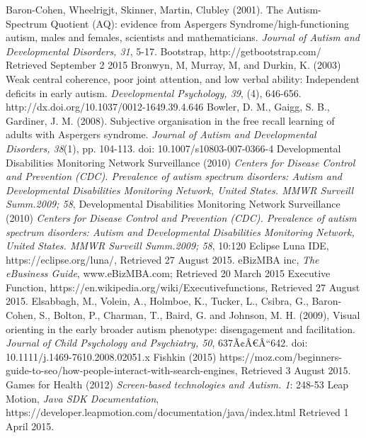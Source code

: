 \documentclass[a4paper, 11pt]{article}
\begin{document}
\begin{thebibliography}{100}

 Baron-Cohen, Wheelrigjt, Skinner, Martin, Clubley (2001).  The Autism-Spectrum Quotient (AQ): evidence from Aspergers Syndrome/high-functioning autism, males and females, scientists and mathematicians.  \textit{Journal of Autism and Developmental Disorders, 31}, 5-17.
Bootstrap, http://getbootstrap.com/ Retrieved September 2 2015
 Bronwyn, M, Murray, M, and Durkin, K. (2003) Weak central coherence, poor joint attention, and low verbal ability: Independent deficits in early autism. \textit{Developmental Psychology, 39}, (4), 646-656. http://dx.doi.org/10.1037/0012-1649.39.4.646
 Bowler, D. M., Gaigg, S. B., Gardiner, J. M. (2008). Subjective organisation in the free recall learning of adults with Aspergers syndrome. \textit{Journal of Autism and Developmental Disorders, 38}(1), pp. 104-113. doi: 10.1007/s10803-007-0366-4 
Developmental Disabilities Monitoring Network Surveillance (2010) \textit{Centers for Disease Control and Prevention (CDC). Prevalence of autism spectrum disorders: Autism and Developmental Disabilities Monitoring Network, United States. MMWR Surveill Summ.2009; 58},
Developmental Disabilities Monitoring Network Surveillance (2010) \textit{Centers for Disease Control and Prevention (CDC). Prevalence of autism spectrum disorders: Autism and Developmental Disabilities Monitoring Network, United States. MMWR Surveill Summ.2009; 58}, 10:120
 Eclipse Luna IDE, https://eclipse.org/luna/, Retrieved 27 August 2015.
eBizMBA inc, \textit{The eBusiness Guide}, www.eBizMBA.com; Retrieved 20 March 2015
 Executive Function, https://en.wikipedia.org/wiki/Executivefunctions, Retrieved 27 August 2015.
Elsabbagh, M., Volein, A., Holmboe, K., Tucker, L., Csibra, G., Baron-Cohen, S., Bolton, P., Charman, T., Baird, G. and Johnson, M. H. (2009), Visual orienting in the early broader autism phenotype: disengagement and facilitation. \textit{Journal of Child Psychology and Psychiatry, 50}, 637Ã¢Â€Â“642. doi: 10.1111/j.1469-7610.2008.02051.x
 Fishkin (2015) https://moz.com/beginners-guide-to-seo/how-people-interact-with-search-engines, Retrieved 3 August 2015.
 Games for Health (2012) \textit{Screen-based technologies and Autism. 1}: 248-53
 Leap Motion, \textit{Java SDK Documentation}, \\https://developer.leapmotion.com/documentation/java/index.html Retrieved 1 April 2015.

\end{thebibliography}
\end{document}
